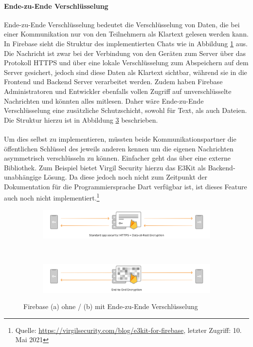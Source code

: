 \paragraph{Ende-zu-Ende Verschlüsselung}
Ende-zu-Ende Verschlüsselung bedeutet die Verschlüsselung von Daten, die bei einer Kommunikation nur von den Teilnehmern als Klartext gelesen werden kann.
In Firebase sieht die Struktur des implementierten Chats wie in Abbildung \ref{fig:firebase_without_encryption} aus.
Die Nachricht ist zwar bei der Verbindung von den Geräten zum Server über das Protokoll HTTPS und über eine lokale Verschlüsselung zum Abspeichern auf dem Server gesichert, jedoch sind diese Daten als Klartext sichtbar, während sie in die Frontend und Backend Server verarbeitet werden.
Zudem haben Firebase Administratoren und Entwickler ebenfalls vollen Zugriff auf unverschlüsselte Nachrichten und könnten alles mitlesen.
Daher wäre Ende-zu-Ende Verschlüsselung eine zusätzliche Schutzschicht, sowohl für Text, als auch Dateien.
Die Struktur hierzu ist in Abbildung \ref{fig:firebase_with_encryption} beschrieben.\\
\\
Um dies selbst zu implementieren, müssten beide Kommunikationspartner die öffentlichen Schlüssel des jeweils anderen kennen um die eigenen Nachrichten asymmetrisch verschlüsseln zu können.
Einfacher geht das über eine externe Bibliothek.
Zum Beispiel bietet Virgil Security hierzu das E3Kit als Backend-unabhängige Lösung.
Da diese jedoch noch nicht zum Zeitpunkt der Dokumentation für die Programmiersprache Dart verfügbar ist, ist dieses Feature auch noch nicht implementiert.\footnote{Quelle: \url{https://virgilsecurity.com/blog/e3kit-for-firebase}, letzter Zugriff: 10. Mai 2021}
\begin{figure}[tbt]
	\begin{subfigure}{\textwidth}
		\centering
		\includegraphics[width=15cm]{Backend_Implementierung/images/firebase_without_p2p_encryption.png}
		\caption{}
		\label{fig:firebase_without_encryption}
	\end{subfigure}\\
	\begin{subfigure}{\textwidth}
		\centering
		\includegraphics[width=15cm]{Backend_Implementierung/images/firebase_with_p2p_encryption.png}
		\caption{}
		\label{fig:firebase_with_encryption}
	\end{subfigure}
	\caption[]{ Firebase (a) ohne / (b) mit Ende-zu-Ende Verschlüsselung \protect \footnotemark}
\end{figure}
